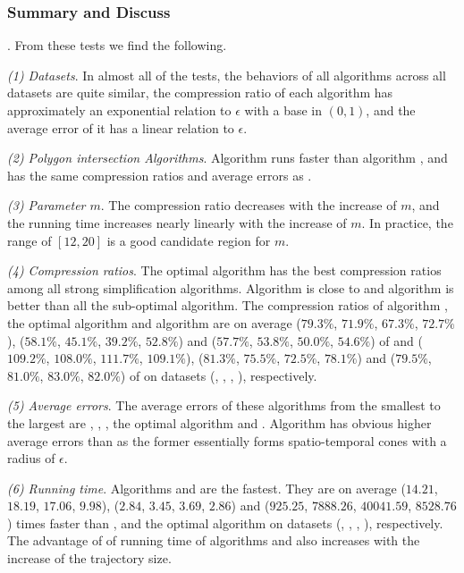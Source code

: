 {%
\subsubsection{Summary and Discuss}
. From these tests we find the following.

\sstab \emph{(1) Datasets}. In almost all of the tests, the behaviors of all algorithms across all datasets are quite similar, \eg the compression ratio of each algorithm has approximately an exponential relation to $\epsilon$ with a base in $(0,1)$, and the average error of it has a linear relation to $\epsilon$.

\sstab \emph{(2) Polygon intersection Algorithms}. Algorithm \rpia runs faster than  algorithm \cpia, and has the same compression ratios and average errors as \cpia.

\sstab\emph{(3) Parameter $m$}. The compression ratio decreases with the increase of $m$, and the running time increases nearly linearly with the increase of $m$. In practice, the range of $[12, 20]$ is a good candidate region for $m$.

\sstab\emph{(4) Compression ratios}. The optimal \lsa algorithm has the best compression ratios among all strong simplification algorithms. Algorithm \cist is close to \dps and algorithm \cista is better than all the sub-optimal \lsa algorithm.
The compression ratios of algorithm \cist, the optimal algorithm and algorithm \cista are on average
($79.3\%$, $71.9\%$, $67.3\%$, $72.7\%$),
{($58.1\%$, $45.1\%$, $39.2\%$, $52.8\%$)} and ($57.7\%$, $53.8\%$, $50.0\%$, $54.6\%$) of \squishe
and ($109.2\%$, $108.0\%$, $111.7\%$, $109.1\%$), {($81.3\%$, $75.5\%$, $72.5\%$, $78.1\%$)} and ($79.5\%$, $81.0\%$, $83.0\%$, $82.0\%$) of \dps on {datasets} (\sercar, \geolife, \mopsi, \pricar), respectively.

\sstab\emph{(5) Average errors}. The average errors of these algorithms from the smallest to the largest are \squishe, \dps, \cist, the optimal \lsa algorithm and \cista. Algorithm \cista has obvious higher average errors than \cist as the former essentially forms spatio-temporal cones with a radius of $\epsilon$.

\sstab\emph{(6) Running time}. Algorithms \cist and \cista are the fastest. They are on average
($14.21$, $18.19$, $17.06$, $9.98$), ($2.84$, $3.45$, $3.69$, $2.86$) and ($925.25$, $7888.26$, $40041.59$, $8528.76$) times faster than \dps, \squishe and the optimal \lsa algorithm on datasets (\sercar, \geolife, \mopsi, \pricar), respectively.
The advantage of of running time of algorithms \cist and \cista also increases  with the increase of the trajectory size.


}
